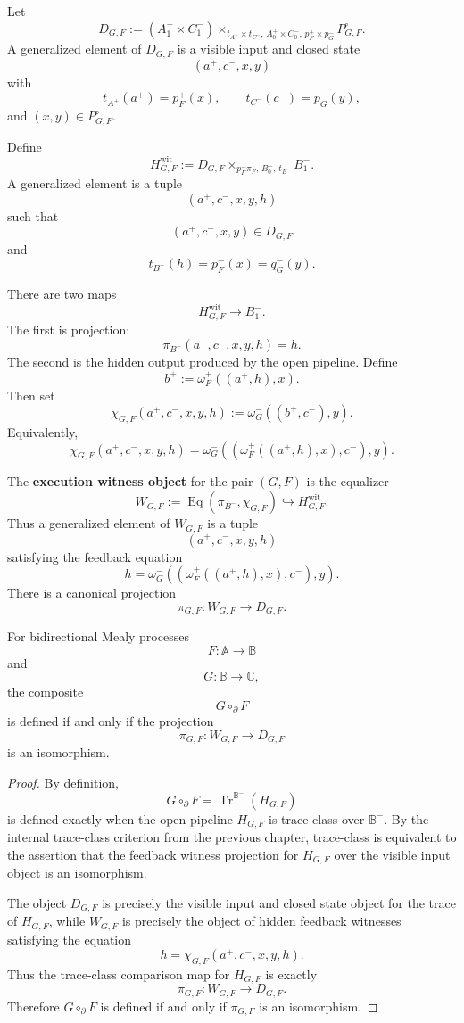 Let
\[
D_{G,F}
:=
(A_1^+\times C_1^-)
\times_{t_{A^+}\times t_{C^-},\,
        A_0^+\times C_0^-,\,
        p_F^+\times p_G^-}
P_{G,F}^{\circ}.
\]
A generalized element of \(D_{G,F}\) is a visible input and closed state
\[
(a^+,c^-,x,y)
\]
with
\[
t_{A^+}(a^+)=p_F^+(x),
\qquad
t_{C^-}(c^-)=p_G^-(y),
\]
and \((x,y)\in P_{G,F}^{\circ}\).

Define
\[
H_{G,F}^{\mathrm{wit}}
:=
D_{G,F}
\times_{p_F^-\pi_F,\,B_0^-,\,t_{B^-}}
B_1^-.
\]
A generalized element is a tuple
\[
(a^+,c^-,x,y,h)
\]
such that
\[
(a^+,c^-,x,y)\in D_{G,F}
\]
and
\[
t_{B^-}(h)=p_F^-(x)=q_G^-(y).
\]

There are two maps
\[
H_{G,F}^{\mathrm{wit}}\to B_1^-.
\]
The first is projection:
\[
\pi_{B^-}(a^+,c^-,x,y,h)=h.
\]
The second is the hidden output produced by the open pipeline.  Define
\[
b^+
:=
\omega_F^+((a^+,h),x).
\]
Then set
\[
\chi_{G,F}(a^+,c^-,x,y,h)
:=
\omega_G^-((b^+,c^-),y).
\]
Equivalently,
\[
\chi_{G,F}(a^+,c^-,x,y,h)
=
\omega_G^-
\left(
\left(
\omega_F^+((a^+,h),x),
c^-
\right),
y
\right).
\]

\begin{definition}
\label{def:execution-witness-object}
The \textbf{execution witness object} for the pair \((G,F)\) is the equalizer
\[
W_{G,F}
:=
\operatorname{Eq}
\left(
\pi_{B^-},\chi_{G,F}
\right)
\hookrightarrow
H_{G,F}^{\mathrm{wit}}.
\]
Thus a generalized element of \(W_{G,F}\) is a tuple
\[
(a^+,c^-,x,y,h)
\]
satisfying the feedback equation
\[
h
=
\omega_G^-
\left(
\left(
\omega_F^+((a^+,h),x),
c^-
\right),
y
\right).
\]
There is a canonical projection
\[
\pi_{G,F}:W_{G,F}\to D_{G,F}.
\]
\end{definition}

\begin{theorem}
\label{thm:goi-execution-criterion}
For bidirectional Mealy processes
\[
F:\mathbb A\to\mathbb B
\]
and
\[
G:\mathbb B\to\mathbb C,
\]
the composite
\[
G\circ_{\partial}F
\]
is defined if and only if the projection
\[
\pi_{G,F}:W_{G,F}\to D_{G,F}
\]
is an isomorphism.
\end{theorem}

\begin{proof}
By definition,
\[
G\circ_{\partial}F
=
\operatorname{Tr}^{\mathbb B^-}(H_{G,F})
\]
is defined exactly when the open pipeline \(H_{G,F}\) is trace-class over
\(\mathbb B^-\).  By the internal trace-class criterion from the previous
chapter, trace-class is equivalent to the assertion that the feedback witness
projection for \(H_{G,F}\) over the visible input object is an isomorphism.

The object \(D_{G,F}\) is precisely the visible input and closed state object
for the trace of \(H_{G,F}\), while \(W_{G,F}\) is precisely the object of
hidden feedback witnesses satisfying the equation
\[
h=\chi_{G,F}(a^+,c^-,x,y,h).
\]
Thus the trace-class comparison map for \(H_{G,F}\) is exactly
\[
\pi_{G,F}:W_{G,F}\to D_{G,F}.
\]
Therefore \(G\circ_{\partial}F\) is defined if and only if
\(\pi_{G,F}\) is an isomorphism.
\end{proof}

